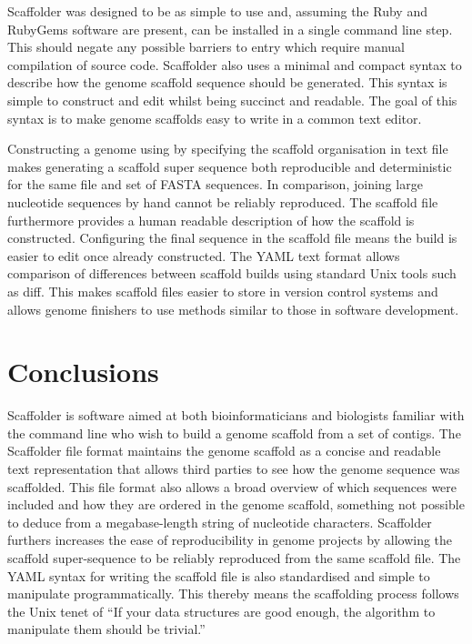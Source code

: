 \documentclass[10pt]{bmc_article}
\newenvironment{bmcformat}{\begin{raggedright}\baselineskip20pt\sloppy\setboolean{publ}{false}}{\end{raggedright}\baselineskip20pt\sloppy}
\begin{document}
\begin{bmcformat}
Scaffolder was designed to be as simple to use and, assuming the Ruby and
RubyGems software are present, can be installed in a single command line step.
This should negate any possible barriers to entry which require manual
compilation of source code. Scaffolder also uses a minimal and compact syntax
to describe how the genome scaffold sequence should be generated. This syntax
is simple to construct and edit whilst being succinct and readable. The goal
of this syntax is to make genome scaffolds easy to write in a common text
editor. \pb

Constructing a genome using by specifying the scaffold organisation in text
file makes generating a scaffold super sequence both reproducible and
deterministic for the same file and set of FASTA sequences. In comparison,
joining large nucleotide sequences by hand cannot be reliably reproduced. The
scaffold file furthermore provides a human readable description of how the
scaffold is constructed. Configuring the final sequence in the scaffold file
means the build is easier to edit once already constructed. The YAML text
format allows comparison of differences between scaffold builds using standard
Unix tools such as diff. This makes scaffold files easier to store in version
control systems and allows genome finishers to use methods similar to those in
software development. \pb 

\clearpage

\section*{Conclusions} %

Scaffolder is software aimed at both bioinformaticians and biologists familiar
with the command line who wish to build a genome scaffold from a set of
contigs. The Scaffolder file format maintains the genome scaffold as a concise
and readable text representation that allows third parties to see how the
genome sequence was scaffolded. This file format also allows a broad overview
of which sequences were included and how they are ordered in the genome
scaffold, something not possible to deduce from a megabase-length string of
nucleotide characters. Scaffolder furthers increases the ease of
reproducibility in genome projects by allowing the scaffold super-sequence to
be reliably reproduced from the same scaffold file. The YAML syntax for
writing the scaffold file is also standardised and simple to manipulate
programmatically. This thereby means the scaffolding process follows the Unix
tenet of ``If your data structures are good enough, the algorithm to
manipulate them should be trivial.''


\end{bmcformat}
\end{document}
